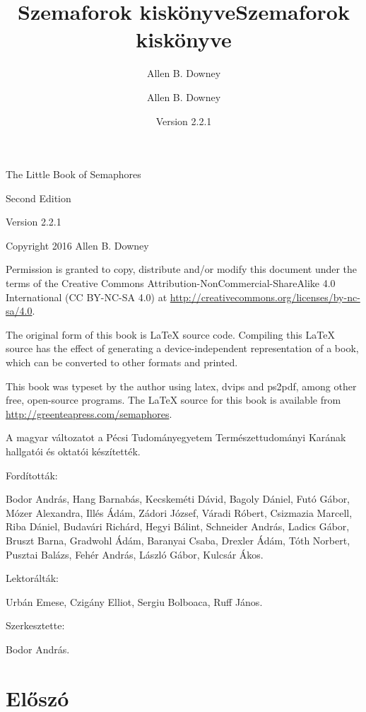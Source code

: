 \documentclass{book}
\title{Szemaforok kiskönyve}
\author{Allen B. Downey}
\newcommand{\theversion}{Version 2.2.1}
\begin{document}
\title {Szemaforok kiskönyve}
\author {Allen B. Downey}

\date {\theversion}
\maketitle

\vspace{2in}
\begin{center}
{\Large The Little Book of Semaphores}

Second Edition
\vspace{0.25in}

\theversion
\vspace{0.25in}

Copyright 2016 Allen B. Downey
\end{center}
\vspace{0.25in}

Permission is granted to copy, distribute and/or modify this
document under the terms of the Creative Commons
Attribution-NonCommercial-ShareAlike 4.0 International (CC BY-NC-SA 4.0)
at \url{http://creativecommons.org/licenses/by-nc-sa/4.0}.

The original form of this book is LaTeX source code.
Compiling this LaTeX source has the effect of generating
a device-independent representation of a book, which
can be converted to other formats and printed.

This book was typeset by the author using latex, dvips and ps2pdf,
among other free, open-source programs.
The LaTeX source for this book is available from
\url{http://greenteapress.com/semaphores}.

A magyar változatot a Pécsi Tudományegyetem Természettudományi Karának hallgatói és oktatói készítették.

Fordították:

Bodor András,
Hang Barnabás,
Kecskeméti Dávid,
Bagoly Dániel,
Futó Gábor,
Mózer Alexandra,
Illés Ádám,
Zádori József,
Váradi Róbert,
Csizmazia Marcell,
Riba Dániel,
Budavári Richárd,
Hegyi Bálint,
Schneider András,
Ladics Gábor,
Bruszt Barna,
Gradwohl Ádám,
Baranyai Csaba,
Drexler Ádám,
Tóth Norbert,
Pusztai Balázs,
Fehér András,
László Gábor,
Kulcsár Ákos.

Lektorálták:

Urbán Emese, Czigány Elliot, Sergiu Bolboaca, Ruff János.

Szerkesztette:

Bodor András.
\frontmatter

\chapter{Előszó}
\end{document}
